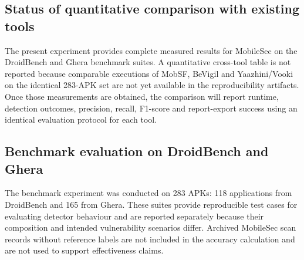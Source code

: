 \subsection{Status of quantitative comparison with existing tools}

The present experiment provides complete measured results for MobileSec on the
DroidBench and Ghera benchmark suites. A quantitative cross-tool table is not
reported because comparable executions of MobSF, BeVigil and Yaazhini/Vooki
on the identical 283-APK set are not yet available in the reproducibility
artifacts. Once those measurements are obtained, the comparison will report
runtime, detection outcomes, precision, recall, F1-score and report-export
success using an identical evaluation protocol for each tool.

\subsection{Benchmark evaluation on DroidBench and Ghera}

The benchmark experiment was conducted on 283 APKs: 118 applications from
DroidBench and 165 from Ghera. These suites provide reproducible test cases for
evaluating detector behaviour and are reported separately because their
composition and intended vulnerability scenarios differ. Archived MobileSec
scan records without reference labels are not included in the accuracy
calculation and are not used to support effectiveness claims.

